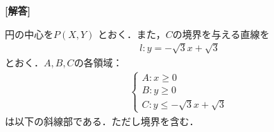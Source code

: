 \documentclass[../../main.tex]{subfiles}
\begin{document}
\begin{oframed}
  
\end{oframed}


{\bf [解答]}

円の中心を$P(X,Y)$ とおく．また，$C$の境界を与える直線を
\begin{align}
  l: y = -\sqrt{3}x + \sqrt{3}
\end{align}
とおく．$A,B,C$の各領域：
\begin{align}
  \begin{cases}
    A: x \ge 0 \\
    B: y \ge 0 \\
    C: y \le -\sqrt{3}x + \sqrt{3}
  \end{cases} \label{eq:1}
\end{align}
は以下の斜線部である．ただし境界を含む．
\end{document}

